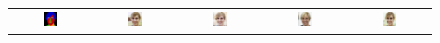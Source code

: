 \begin{figure}[]
\begin{tabular} {cc|cc|c}
\includegraphics[width=0.1932\textwidth]{Images/Rec/Faces/label/28092.png} & \includegraphics[width=0.1932\textwidth]{Images/Rec/Faces/gt/28092.jpg} &
\includegraphics[width=0.1932\textwidth]{Images/Rec/Faces/pix2pixhd/28092.jpg} &   \includegraphics[width=0.1932\textwidth]{Images/Rec/Faces/spade/28092.jpg} &  \includegraphics[width=0.1932\textwidth]{Images/Rec/Faces/ours/28092.png} \\


\end{tabular}
\end{figure}
